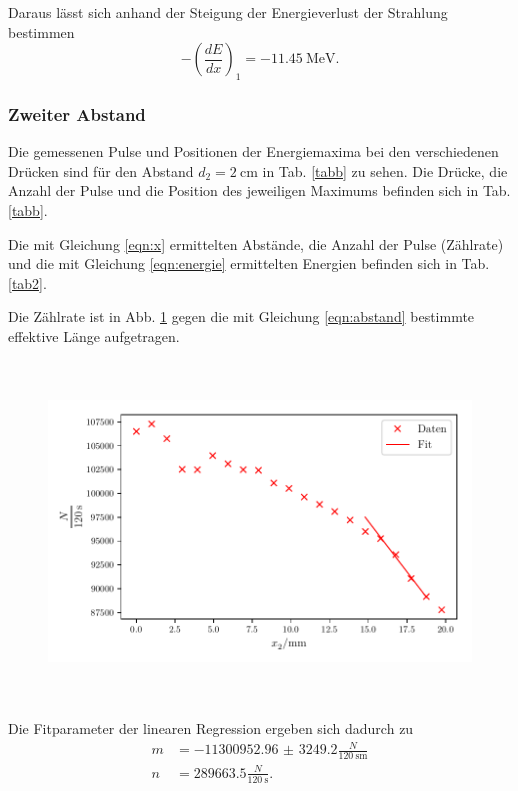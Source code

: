 \noindent Daraus lässt sich anhand der Steigung der Energieverlust der Strahlung bestimmen %
\begin{equation*}
    - \left( \frac{dE}{dx} \right)_1 = - \SI{11.45}{\mega\electronvolt}.
\end{equation*}


\subsubsection{Zweiter Abstand}
Die gemessenen Pulse und Positionen der Energiemaxima bei den verschiedenen Drücken sind für den Abstand $d_2 = \SI{2}{\centi\meter}$ in Tab. \ref{tabb} zu sehen. Die Drücke, die Anzahl der Pulse und die Position des jeweiligen Maximums befinden sich in Tab. \ref{tabb}. 



Die mit Gleichung \eqref{eqn:x} ermittelten Abstände, die Anzahl der Pulse (Zählrate) und die mit Gleichung \eqref{eqn:energie} ermittelten Energien befinden sich in Tab. \ref{tab2}. 

\noindent Die Zählrate ist in Abb. \ref{fig:zaehlrate2} gegen die mit Gleichung \eqref{eqn:abstand} bestimmte effektive Länge aufgetragen.
\begin{figure}
    \centering
    \includegraphics[width=12cm, height=9cm]{build/plotc.pdf}
    \caption{}
    \label{fig:zaehlrate2}
\end{figure}

\noindent Die Fitparameter der linearen Regression ergeben sich dadurch zu 
\begin{align*}
    m &= \num{-11300952.96(324920)} \frac{N}{\SI{120}{\second} \si{\meter}} \\
    n &= \num{289663.5} \frac{N}{\SI{120}{\second}} .
\end{align*}


